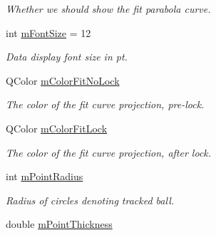 \begin{DoxyCompactItemize}
\begin{DoxyCompactList}\small\item\em Whether we should show the fit parabola curve. \end{DoxyCompactList}\item 
int \hyperlink{classProjectorWindow_a482d9dae424e09a66acb76f663ecd5bc}{m\+Font\+Size} = 12\hypertarget{classProjectorWindow_a482d9dae424e09a66acb76f663ecd5bc}{}\label{classProjectorWindow_a482d9dae424e09a66acb76f663ecd5bc}

\begin{DoxyCompactList}\small\item\em Data display font size in pt. \end{DoxyCompactList}\item 
Q\+Color \hyperlink{classProjectorWindow_a365d0971caa7390079d9fea7130dffd2}{m\+Color\+Fit\+No\+Lock}\hypertarget{classProjectorWindow_a365d0971caa7390079d9fea7130dffd2}{}\label{classProjectorWindow_a365d0971caa7390079d9fea7130dffd2}

\begin{DoxyCompactList}\small\item\em The color of the fit curve projection, pre-\/lock. \end{DoxyCompactList}\item 
Q\+Color \hyperlink{classProjectorWindow_aaed1551318462e0783051763e83f383d}{m\+Color\+Fit\+Lock}\hypertarget{classProjectorWindow_aaed1551318462e0783051763e83f383d}{}\label{classProjectorWindow_aaed1551318462e0783051763e83f383d}

\begin{DoxyCompactList}\small\item\em The color of the fit curve projection, after lock. \end{DoxyCompactList}\item 
int \hyperlink{classProjectorWindow_a49c0897416d0f7e4a889961eb345be1c}{m\+Point\+Radius}\hypertarget{classProjectorWindow_a49c0897416d0f7e4a889961eb345be1c}{}\label{classProjectorWindow_a49c0897416d0f7e4a889961eb345be1c}

\begin{DoxyCompactList}\small\item\em Radius of circles denoting tracked ball. \end{DoxyCompactList}\item 
double \hyperlink{classProjectorWindow_aa601b12af40890165f24a0e291365bf0}{m\+Point\+Thickness}\hypertarget{classProjectorWindow_aa601b12af40890165f24a0e291365bf0}{}\label{classProjectorWindow_aa601b12af40890165f24a0e291365bf0}


\end{DoxyCompactItemize}
